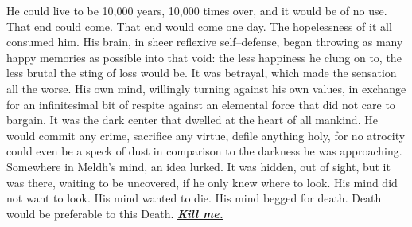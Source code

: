He could live to be 10,000 years, 10,000 times over, and it would be of no use. That end could come. That end would come one day. The hopelessness of it all consumed him. His brain, in sheer reflexive self\mbox{--}defense, began throwing as many happy memories as possible into that void: the less happiness he clung on to, the less brutal the sting of loss would be.
\SmallVSpace
It was betrayal, which made the sensation all the worse. His own mind, willingly turning against his own values, in exchange for an infinitesimal bit of respite against an elemental force that did not care to bargain. It was the dark center that dwelled at the heart of all mankind. He would commit any crime, sacrifice any virtue, defile anything holy, for no atrocity could even be a speck of dust in comparison to the darkness he was approaching.
\SmallVSpace
Somewhere in Meldh’s mind, an idea lurked. It was hidden, out of sight, but it was there, waiting to be uncovered, if he only knew where to look. His mind did not want to look. His mind wanted to die. His mind begged for death. Death would be preferable to this Death.
\SomeVSpace
\emph{\textbf{\underline{Kill me.}}}


